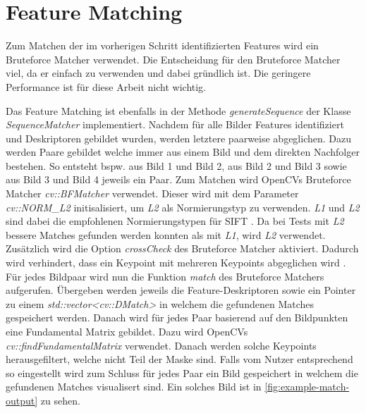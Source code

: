 \section{Feature Matching}
Zum Matchen der im vorherigen Schritt identifizierten Features wird ein Bruteforce Matcher verwendet.
Die Entscheidung für den Bruteforce Matcher viel, da er einfach zu verwenden und dabei gründlich ist.
Die geringere Performance ist für diese Arbeit nicht wichtig.

Das Feature Matching ist ebenfalls in der Methode \emph{generateSequence} der Klasse \emph{SequenceMatcher} implementiert.
Nachdem für alle Bilder Features identifiziert und Deskriptoren gebildet wurden, werden letztere paarweise abgeglichen.
Dazu werden Paare gebildet welche immer aus einem Bild und dem direkten Nachfolger bestehen.
So entsteht bspw. aus Bild 1 und Bild 2, aus Bild 2 und Bild 3 sowie aus Bild 3 und Bild 4 jeweils ein Paar.
Zum Matchen wird OpenCVs Bruteforce Matcher \emph{cv::BFMatcher}\cite{opencv_doc_bfmatcher} verwendet.
Dieser wird mit dem Parameter \emph{cv::NORM\_L2} initisalisiert, um \emph{L2} als Normierungstyp zu verwenden.
\emph{L1} und \emph{L2} sind dabei die empfohlenen Normierungstypen für SIFT \cite{opencv_doc_bfmatcher_create}.
Da bei Tests mit \emph{L2} bessere Matches gefunden werden konnten als mit \emph{L1}, wird \emph{L2} verwendet.
Zusätzlich wird die Option \emph{crossCheck} des Bruteforce Matcher aktiviert.
Dadurch wird verhindert, dass ein Keypoint mit mehreren Keypoints abgeglichen wird \cite{opencv_doc_bfmatcher_create}.
Für jedes Bildpaar wird nun die Funktion \emph{match}\cite{opencv_doc_match} des Bruteforce Matchers aufgerufen.
Übergeben werden jeweils die Feature-Deskriptoren sowie ein Pointer zu einem \emph{std::vector<cv::DMatch>} in welchem die gefundenen Matches gespeichert werden.
Danach wird für jedes Paar basierend auf den Bildpunkten eine Fundamental Matrix gebildet.
Dazu wird OpenCVs \emph{cv::findFundamentalMatrix}\cite{opencv_doc_find_fundamental_mat} verwendet.
Danach werden solche Keypoints herausgefiltert, welche nicht Teil der Maske sind.
Falls vom Nutzer entsprechend so eingestellt wird zum Schluss für jedes Paar ein Bild gespeichert in welchem die gefundenen Matches visualisert sind.
Ein solches Bild ist in \autoref{fig:example-match-output} zu sehen.